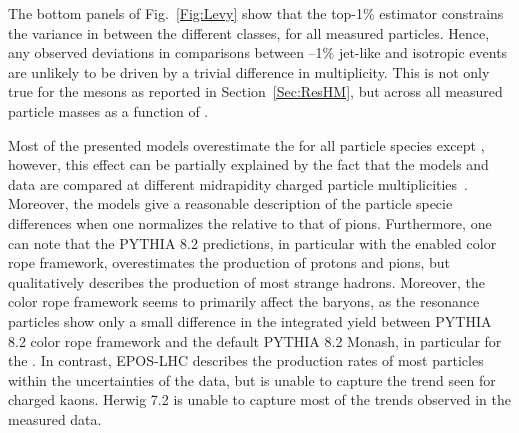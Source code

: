The bottom panels of Fig.~\ref{Fig:Levy} show that the top-1\% \tracklet estimator constrains the variance in \myield between the different \SOPT classes, for all measured particles.  Hence, any observed deviations in comparisons between --1\% jet-like and isotropic events are unlikely to be driven by a trivial difference in multiplicity. This is not only true for the \PI mesons as reported in Section~\ref{Sec:ResHM}, but across all measured particle masses as a function of \SOPT. 

Most of the presented models overestimate the \mpt for all particle species except \KSTAR, however, this effect can be partially explained by the fact that the models and data are compared at different midrapidity charged particle multiplicities~\cite{ALICE:2020nkc}. Moreover, the models give a reasonable description of the particle specie differences when one normalizes the \mpt relative to that of pions. Furthermore, one can note that the PYTHIA 8.2 predictions, in particular with the enabled color rope framework, overestimates the production of protons and pions, but qualitatively describes the production of most strange hadrons. Moreover, the color rope framework seems to primarily affect the baryons, as the resonance particles show only a small difference in the integrated yield between PYTHIA 8.2 color rope framework and the default PYTHIA 8.2 Monash, in particular for the \KSTAR. In contrast, EPOS-LHC describes the production rates of most particles within the uncertainties of the data, but is unable to capture the trend seen for charged kaons. Herwig 7.2 is unable to capture most of the trends observed in the measured data.

